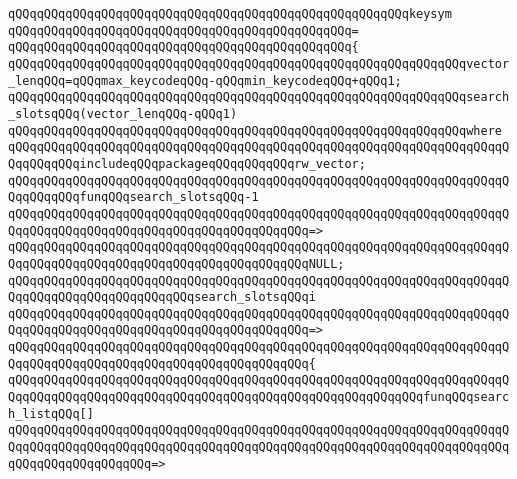 \verb|qQQqqQQqqQQqqQQqqQQqqQQqqQQqqQQqqQQqqQQqqQQqqQQqqQQqqQQqkeysym|\newline
\verb|qQQqqQQqqQQqqQQqqQQqqQQqqQQqqQQqqQQqqQQqqQQqqQQq=|\newline
\verb|qQQqqQQqqQQqqQQqqQQqqQQqqQQqqQQqqQQqqQQqqQQqqQQq{|\newline
\verb|qQQqqQQqqQQqqQQqqQQqqQQqqQQqqQQqqQQqqQQqqQQqqQQqqQQqqQQqqQQqqQQqvector_lenqQQq=qQQqmax_keycodeqQQq-qQQqmin_keycodeqQQq+qQQq1;|\newline
\newline
\verb|qQQqqQQqqQQqqQQqqQQqqQQqqQQqqQQqqQQqqQQqqQQqqQQqqQQqqQQqqQQqqQQqsearch_slotsqQQq(vector_lenqQQq-qQQq1)|\newline
\verb|qQQqqQQqqQQqqQQqqQQqqQQqqQQqqQQqqQQqqQQqqQQqqQQqqQQqqQQqqQQqqQQqwhere|\newline
\verb|qQQqqQQqqQQqqQQqqQQqqQQqqQQqqQQqqQQqqQQqqQQqqQQqqQQqqQQqqQQqqQQqqQQqqQQqqQQqqQQqincludeqQQqpackageqQQqqQQqqQQqrw_vector;|\newline
\newline
\newline
\verb|qQQqqQQqqQQqqQQqqQQqqQQqqQQqqQQqqQQqqQQqqQQqqQQqqQQqqQQqqQQqqQQqqQQqqQQqqQQqqQQqfunqQQqsearch_slotsqQQq-1|\newline
\verb|qQQqqQQqqQQqqQQqqQQqqQQqqQQqqQQqqQQqqQQqqQQqqQQqqQQqqQQqqQQqqQQqqQQqqQQqqQQqqQQqqQQqqQQqqQQqqQQqqQQqqQQqqQQqqQQq=>|\newline
\verb|qQQqqQQqqQQqqQQqqQQqqQQqqQQqqQQqqQQqqQQqqQQqqQQqqQQqqQQqqQQqqQQqqQQqqQQqqQQqqQQqqQQqqQQqqQQqqQQqqQQqqQQqqQQqqQQqNULL;|\newline
\newline
\verb|qQQqqQQqqQQqqQQqqQQqqQQqqQQqqQQqqQQqqQQqqQQqqQQqqQQqqQQqqQQqqQQqqQQqqQQqqQQqqQQqqQQqqQQqqQQqqQQqsearch_slotsqQQqi|\newline
\verb|qQQqqQQqqQQqqQQqqQQqqQQqqQQqqQQqqQQqqQQqqQQqqQQqqQQqqQQqqQQqqQQqqQQqqQQqqQQqqQQqqQQqqQQqqQQqqQQqqQQqqQQqqQQqqQQq=>|\newline
\verb|qQQqqQQqqQQqqQQqqQQqqQQqqQQqqQQqqQQqqQQqqQQqqQQqqQQqqQQqqQQqqQQqqQQqqQQqqQQqqQQqqQQqqQQqqQQqqQQqqQQqqQQqqQQqqQQq{|\newline
\verb|qQQqqQQqqQQqqQQqqQQqqQQqqQQqqQQqqQQqqQQqqQQqqQQqqQQqqQQqqQQqqQQqqQQqqQQqqQQqqQQqqQQqqQQqqQQqqQQqqQQqqQQqqQQqqQQqqQQqqQQqqQQqqQQqfunqQQqsearch_listqQQq[]|\newline
\verb|qQQqqQQqqQQqqQQqqQQqqQQqqQQqqQQqqQQqqQQqqQQqqQQqqQQqqQQqqQQqqQQqqQQqqQQqqQQqqQQqqQQqqQQqqQQqqQQqqQQqqQQqqQQqqQQqqQQqqQQqqQQqqQQqqQQqqQQqqQQqqQQqqQQqqQQqqQQqqQQq=>|\newline
